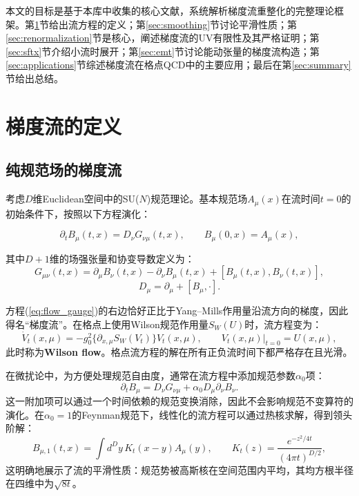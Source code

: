 \documentclass[12pt,a4paper]{ctexart}
\theoremstyle{definition}
\begin{document}
本文的目标是基于本库中收集的核心文献，系统解析梯度流重整化的完整理论框架。第\ref{sec:definition}节给出流方程的定义；第\ref{sec:smoothing}节讨论平滑性质；第\ref{sec:renormalization}节是核心，阐述梯度流的UV有限性及其严格证明；第\ref{sec:sftx}节介绍小流时展开；第\ref{sec:emt}节讨论能动张量的梯度流构造；第\ref{sec:applications}节综述梯度流在格点QCD中的主要应用；最后在第\ref{sec:summary}节给出总结。

\section{梯度流的定义}\label{sec:definition}

\subsection{纯规范场的梯度流}

考虑$D$维Euclidean空间中的SU($N$)规范理论。基本规范场$A_\mu(x)$在流时间$t=0$的初始条件下，按照以下方程演化\cite{Luscher2010,LuscherWeisz2011}：

\begin{equation}
\partial_t B_\mu(t,x) = D_\nu G_{\nu\mu}(t,x), \qquad B_\mu(0,x) = A_\mu(x),
\label{eq:flow_gauge}
\end{equation}

其中$D+1$维的场强张量和协变导数定义为：
\begin{equation}
G_{\mu\nu}(t,x) = \partial_\mu B_\nu(t,x) - \partial_\nu B_\mu(t,x) + [B_\mu(t,x), B_\nu(t,x)],
\label{eq:G_munu}
\end{equation}
\begin{equation}
D_\mu = \partial_\mu + [B_\mu, \cdot].
\label{eq:D_mu}
\end{equation}

方程(\ref{eq:flow_gauge})的右边恰好正比于Yang--Mills作用量沿流方向的梯度，因此得名``梯度流''。在格点上使用Wilson规范作用量$S_W(U)$时，流方程变为\cite{Luscher2010}：
\begin{equation}
\dot{V}_t(x,\mu) = -g_0^2 \{\partial_{x,\mu} S_W(V_t)\} V_t(x,\mu), \qquad V_t(x,\mu)|_{t=0} = U(x,\mu),
\label{eq:wilson_flow}
\end{equation}
此时称为\textbf{Wilson flow}。格点流方程的解在所有正负流时间下都严格存在且光滑。

在微扰论中，为方便处理规范自由度，通常在流方程中添加规范参数$\alpha_0$项\cite{LuscherWeisz2011}：
\begin{equation}
\partial_t B_\mu = D_\nu G_{\nu\mu} + \alpha_0 D_\mu \partial_\nu B_\nu.
\label{eq:flow_gauge_fixed}
\end{equation}
这一附加项可以通过一个时间依赖的规范变换消除，因此不会影响规范不变算符的演化\cite{Luscher2010}。在$\alpha_0=1$的Feynman规范下，线性化的流方程可以通过热核求解，得到领头阶解：
\begin{equation}
B_{\mu,1}(t,x) = \int d^D y \, K_t(x-y) A_\mu(y), \qquad
K_t(z) = \frac{e^{-z^2/4t}}{(4\pi t)^{D/2}},
\label{eq:leading_order_B}
\end{equation}
这明确地展示了流的平滑性质：规范势被高斯核在空间范围内平均，其均方根半径在四维中为$\sqrt{8t}$。
\end{document}
